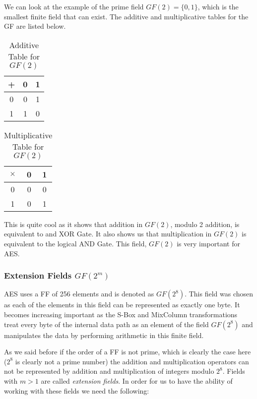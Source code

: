 We can look at the example of the prime field $GF(2) = \{0,1\}$, which is the smallest finite field that can exist. The additive and multiplicative tables for the GF are listed below.


\begin{table}[H]
\begin{center}
\begin{tabular}{ |c|cc| } 
 \hline
 + & 0 & 1 \\ 
 \hline
 0 & 0 & 1 \\ 
 1 & 1 & 0 \\ 
 \hline
\end{tabular}
\caption{Additive Table for $GF(2)$}
\label{GF-2-Addition}
\end{center}
\end{table}

\begin{table}[H]
\begin{center}
\begin{tabular}{ |c|cc| } 
 \hline
 $\times$ & 0 & 1 \\ 
 \hline
 0 & 0 & 0 \\ 
 1 & 0 & 1 \\ 
 \hline
\end{tabular}
\caption{Multiplicative Table for $GF(2)$}
\label{GF-2-Multiplicative}
\end{center}
\end{table}

This is quite cool as it shows that addition in $GF(2)$, modulo 2 addition, is equivalent to and XOR Gate. It also shows us that multiplication in $GF(2)$ is equivalent to the logical AND Gate. This field, $GF(2)$ is very important for AES.

\subsubsection{Extension Fields $GF(2^m)$}  

AES uses a FF of 256 elements and is denoted as $GF(2^8)$. This field was chosen as each of the elements in this field can be represented as exactly one byte. It becomes increasing important as the S-Box and MixColumn transformations treat every byte of the internal data path as an element of the field $GF(2^8)$ and manipulates the data by performing arithmetic in this finite field.

As we said before if the order of a FF is not prime, which is clearly the case here ($2^8$ is clearly not a prime number) the addition and multiplication operators can not be represented by addition and multiplication of integers modulo $2^8$. Fields with $m>1$ are called \textit{extension fields}. In order for us to have the ability of working with these fields we need the following:

